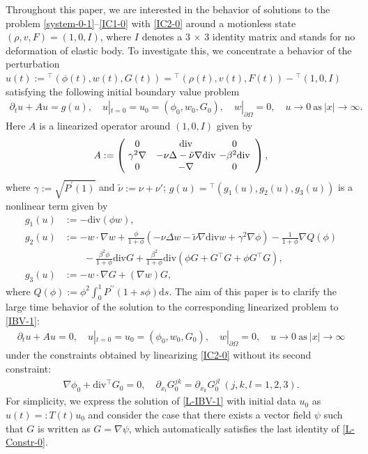 \documentclass[dvipdfmx,12pt]{article}
\begin{document}
Throughout this paper, we are interested in the behavior of solutions to the problem \eqref{system-0-1}--\eqref{IC1-0} with \eqref{IC2-0} around a motionless state $(\rho,v,F)=(1,0,I)$, where $I$ denotes a 3 $\times$ 3 identity matrix and stands for no deformation of elastic body. To investigate this, we concentrate a behavior of the perturbation 
$u(t):={}^\top(\phi(t),w(t),G(t))={}^\top(\rho(t),v(t),F(t))-{}^\top(1,0,I)$ satisfying the following initial boundary value problem
\begin{gather}
\partial_t u+A u=g(u), \quad
u|_{t=0}=u_0=(\phi_0,w_0,G_0),  \quad
w|_{\partial \Omega}=0, \quad u\to0~\mathrm{as}~|x|\to\infty. \label{IBV-1}
\end{gather}
Here $A$ is a linearized operator around $(1,0,I)$ given by
\begin{equation} \label{def-L}
A:=
\left(
\begin{array}{@{\ }cc@{\ }cc@{\ } }
0 & \mathrm{div} & 0\\
\gamma^2\nabla & -\nu\Delta-\tilde{\nu}\nabla\mathrm{div} & -\beta^2\mathrm{div} \\
0 & -\nabla & 0
\end{array}
\right),
\end{equation}
where $\gamma:=\sqrt{P^\prime(1)}$ and $\tilde{\nu}:=\nu+\nu'$; $g(u)={}^\top (g_1(u),g_2(u),g_3(u))$ is a nonlinear term given by
\begin{align*}
g_1(u)&:=-\mathrm{div}(\phi w), \\
g_2(u)&:=-w\cdot\nabla w+\frac{\phi}{1+\phi}(-\nu\Delta w-\tilde{\nu}\nabla\mathrm{div}w+\gamma^2\nabla \phi)-\frac{1}{1+\phi}\nabla Q(\phi)\\
&\quad\quad-\frac{\beta^2\phi}{1+\phi}\mathrm{div} G +\frac{\beta^2}{1+\phi}\mathrm{div}(\phi G+G{}^\top\! G+\phi G{}^\top\! G), \\
g_3(u)&:=-w\cdot\nabla G+(\nabla w) G, 
\end{align*}
where $Q(\phi):=\phi^2\int_0^1 {P}^{\prime\prime}(1+s\phi)\mathrm{d}s $. The aim of this paper is to clarify the large time behavior of the solution to the corresponding linearized problem to \eqref{IBV-1}:
\begin{gather}
\partial_t u +Au = 0, \quad
u|_{t=0}=u_0=(\phi_0,w_0,G_0), \quad
w|_{\partial \Omega}=0, \quad u\to0~\mathrm{as}~|x|\to\infty \label{L-IBV-1} 
\end{gather}
under the constraints obtained by linearizing \eqref{IC2-0} without its second constraint:
\begin{gather}
\nabla \phi_0+ \mathrm{div}{}^\top\! G_0 =0,  \quad
\partial_{x_l} G_0^{jk} =\partial_{x_k} G_0^{jl}~(j,k,l=1,2,3). \label{L-Constr-0}
\end{gather}
For simplicity, we express the solution of \eqref{L-IBV-1} with initial data $u_0$ as $u(t)=:T(t)u_0$ and consider the case that there exists a vector field $\psi$ such that $G$ is written as $G=\nabla \psi$, which automatically satisfies the last identity of \eqref{L-Constr-0}.
\end{document}
